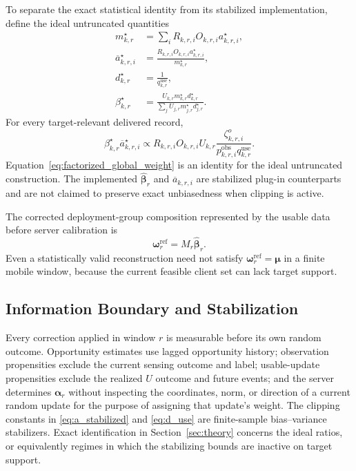 \documentclass[letterpaper,journal]{IEEEtran}
\begin{document}
To separate the exact statistical identity from its stabilized implementation,
define the ideal untruncated quantities
\begin{align}
 m^\star_{k,r}
 &=
 \sum_i
 R_{k,r,i}O_{k,r,i}a^\star_{k,r,i},
 \label{eq:m_star}\\
 \overline a^\star_{k,r,i}
 &=
 \frac{
 R_{k,r,i}O_{k,r,i}a^\star_{k,r,i}
 }{m^\star_{k,r}},
 \label{eq:abar_star}\\
 d^\star_{k,r}
 &=
 \frac{1}{q^{\mathrm{use}}_{k,r}},
 \label{eq:d_star}\\
 \beta^\star_{k,r}
 &=
 \frac{
 U_{k,r}m^\star_{k,r}d^\star_{k,r}
 }{
 \sum_j U_{j,r}m^\star_{j,r}d^\star_{j,r}
 }.
 \label{eq:beta_star}
\end{align}
For every target-relevant delivered record,
\begin{equation}
 \beta^\star_{k,r}\overline a^\star_{k,r,i}
 \propto
 R_{k,r,i}O_{k,r,i}U_{k,r}
 \frac{\zeta^{o}_{k,r,i}}
 {p^{\mathrm{obs}}_{k,r,i}q^{\mathrm{use}}_{k,r}}.
 \label{eq:factorized_global_weight}
\end{equation}
Equation~\eqref{eq:factorized_global_weight} is an identity for the ideal
untruncated construction.  The implemented
$\widehat{\boldsymbol\beta}_r$ and $\overline a_{k,r,i}$ are stabilized plug-in
counterparts and are not claimed to preserve exact unbiasedness when clipping
is active.

The corrected deployment-group composition represented by the usable data
before server calibration is
\begin{equation}
    \boldsymbol\omega_r^{\mathrm{ref}}
    =
    M_r\widehat{\boldsymbol\beta}_r.
    \label{eq:omega_ref}
\end{equation}
Even a statistically valid reconstruction need not satisfy
$\boldsymbol\omega_r^{\mathrm{ref}}=\boldsymbol\mu$ in a finite mobile window,
because the current feasible client set can lack target support.

\subsection{Information Boundary and Stabilization}
\label{subsec:information_boundary}

Every correction applied in window $r$ is measurable before its own random
outcome.  Opportunity estimates use lagged opportunity history; observation
propensities exclude the current sensing outcome and label; usable-update
propensities exclude the realized $U$ outcome and future events; and the server
determines $\boldsymbol\alpha_r$ without inspecting the coordinates, norm, or
direction of a current random update for the purpose of assigning that update's
weight.  The clipping constants in
\eqref{eq:a_stabilized} and \eqref{eq:d_use} are finite-sample
bias--variance stabilizers.  Exact identification in
Section~\ref{sec:theory} concerns the ideal ratios, or equivalently regimes in
which the stabilizing bounds are inactive on target support.
\end{document}
